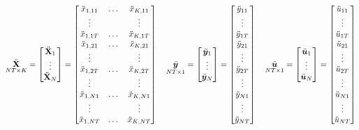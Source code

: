 \documentclass[11pt, oneside, a4paper, article]{article}
\numberwithin{equation}{section}
\begin{document}
\begin{align*}
	\underset{NT \times K}{\ddot{\mathbf{X}}} = 
	\begin{bmatrix}
		\ddot{\mathbf{X}}_{1} \\ \vdots \\ \ddot{\mathbf{X}}_{N}
	\end{bmatrix}
	=
	\begin{bmatrix}
		\ddot{x}_{1,11} & \dots & \ddot{x}_{K, 11} \\
		\vdots          &       &  \vdots          \\
		\ddot{x}_{1,1T} & \dots & \ddot{x}_{K, 1T} \\
		\ddot{x}_{1,21} & \dots & \ddot{x}_{K, 21} \\
		\vdots          &       &  \vdots          \\
		\ddot{x}_{1,2T} & \dots & \ddot{x}_{K, 2T} \\
		\vdots          &       &  \vdots          \\
		\ddot{x}_{1,N1} & \dots & \ddot{x}_{K, N1} \\
		\vdots          &       &  \vdots          \\
		\ddot{x}_{1,NT} & \dots & \ddot{x}_{K, NT}
	\end{bmatrix}
	\quad
	\underset{NT \times 1}{\ddot{\boldsymbol{y}}} = 
	\begin{bmatrix}
		\ddot{\boldsymbol{y}}_{1} \\ \vdots \\ \ddot{\boldsymbol{y}}_{N}
	\end{bmatrix}
	=
	\begin{bmatrix}
		\ddot{y}_{11} \\ \vdots \\ \ddot{y}_{1T} \\
		\ddot{y}_{21} \\ \vdots \\ \ddot{y}_{2T} \\
		\vdots \\
		\ddot{y}_{N1} \\ \vdots \\ \ddot{y}_{NT} \\
	\end{bmatrix}
	\quad
	\underset{NT \times 1}{\ddot{\boldsymbol{u}}} = 
	\begin{bmatrix}
		\ddot{\boldsymbol{u}}_{1} \\ \vdots \\ \ddot{\boldsymbol{u}}_{N}
	\end{bmatrix}
	=
	\begin{bmatrix}
		\ddot{u}_{11} \\ \vdots \\ \ddot{u}_{1T} \\
		\ddot{u}_{21} \\ \vdots \\ \ddot{u}_{2T} \\
		\vdots \\
		\ddot{u}_{N1} \\ \vdots \\ \ddot{u}_{NT} \\
	\end{bmatrix}
\end{align*}
\end{document}
